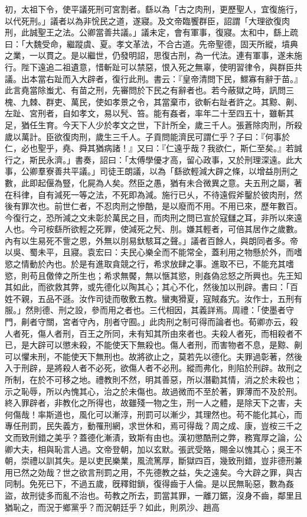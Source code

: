 \begin{pinyinscope}
初，太祖下令，使平議死刑可宮割者。繇以為「古之肉刑，更歷聖人，宜復施行，以代死刑。」議者以為非恱民之道，遂寢。及文帝臨饗群臣，詔謂「大理欲復肉刑，此誠聖王之法。公卿當善共議。」議未定，會有軍事，復寢。太和中，繇上疏曰：「大魏受命，繼蹤虞、夏。孝文革法，不合古道。先帝聖德，固天所縱，墳典之業，一以貫之。是以繼世，仍發明詔，思復古刑，為一代法。連有軍事，遂未施行。陛下遠追二祖遺意，惜斬趾可以禁惡，恨入死之無辜，使明習律令，與群臣共議。出本當右趾而入大辟者，復行此刑。書云：『皇帝清問下民，鰥寡有辭于苗。』此言堯當除蚩尤、有苗之刑，先審問於下民之有辭者也。若今蔽獄之時，訊問三槐、九棘、群吏、萬民，使如孝景之令，其當棄巿，欲斬右趾者許之。其黥、劓、左趾、宮刑者，自如孝文，易以髠、笞。能有姦者，率年二十至四五十，雖斬其足，猶任生育。今天下人少於孝文之世，下計所全，歲三千人。張蒼除肉刑，所殺歲以萬計。臣欲復肉刑，歲生三千人。子貢問能濟民可謂仁乎？子曰：『何事於仁，必也聖乎，堯、舜其猶病諸！』又曰：『仁遠乎哉？我欲仁，斯仁至矣。』若誠行之，斯民永濟。」書奏，詔曰：「太傅學優才高，留心政事，又於刑理深遠。此大事，公卿羣寮善共平議。」司徒王朗議，以為「繇欲輕減大辟之條，以增益刖刑之數，此即起偃為豎，化屍為人矣。然臣之愚，猶有未合微異之意。夫五刑之屬，著在科律，自有減死一等之法，不死即為減。施行已乆，不待遠假斧鑿於彼肉刑，然後有罪次也。前世仁者，不忍肉刑之慘酷，是以廢而不用。不用已來，歷年數百。今復行之，恐所減之文未彰於萬民之目，而肉刑之問已宣於寇讎之耳，非所以來遠人也。今可桉繇所欲輕之死罪，使減死之髠、刖。嫌其輕者，可倍其居作之歲數。內有以生易死不訾之恩，外無以刖易釱駭耳之聲。」議者百餘人，與朗同者多。帝以吳、蜀未平，且寢。袁宏曰：夫民心樂全而不能常全，蓋利用之物懸於外，而嗜慾之情動於內也。於是有進取貪競之行，希求放肆之事。進取不已，不能充其嗜慾，則苟且儌倖之所生也；希求無饜，無以愜其慾，則姦偽忿怒之所興也。先王知其如此，而欲救其弊，或先德化以陶其心；其心不化，然後加以刑辟。書曰：「百姓不親，五品不遜。汝作司徒而敬敷五教。蠻夷猾夏，寇賊姦宄。汝作士，五刑有服。」然則德、刑之設，參而用之者也。三代相因，其義詳焉。周禮：「使墨者守門，劓者守關，宮者守內，刖者守囿。」此肉刑之制可得而論者也。荀卿亦云，殺人者死，傷人者刑，百王之所同，未有知其所由來者也。夫殺人者死，而相殺者不已，是大辟可以懲未殺，不能使天下無殺也。傷人者刑，而害物者不息，是黥、劓可以懼未刑，不能使天下無刑也。故將欲止之，莫若先以德化。夫罪過彰著，然後入于刑辟，是將殺人者不必死，欲傷人者不必刑。縱而弗化，則陷於刑辟。故刑之所制，在於不可移之地。禮教則不然，明其善惡，所以潛勸其情，消之於未殺也；示之恥辱，所以內愧其心，治之於未傷也。故過微而不至於著，罪薄而不及於刑。終入罪辟者，非教化之所得也，故雖殘一物之生，刑一人之體，是除天下之害，夫何傷哉！率斯道也，風化可以漸淳，刑罰可以漸少，其理然也。苟不能化其心，而專任刑罰，民失義方，動罹刑網，求世休和，焉可得哉？周之成、康，豈桉三千之文而致刑錯之美乎？蓋德化漸漬，致斯有由也。漢初懲酷刑之弊，務寬厚之論，公卿大夫，相與恥言人過。文帝登朝，加以玄默。張武受賂，賜金以愧其心；吳王不朝，崇禮以訓其失。是以吏民樂業，風流篤厚，斷獄四百，幾致刑錯，豈非德刑兼用已然之効哉？世之欲言刑罰之用，不先德教之益，失之遠矣。今大辟之罪，與古同制。免死已下，不過五歲，旣釋鉗鎖，復得齒于人倫。是以民無恥惡，數為姦盜，故刑徒多而亂不治也。苟教之所去，罰當其罪，一離刀鋸，沒身不齒，鄰里且猶恥之，而況于鄉黨乎？而況朝廷乎？如此，則夙沙、趙高
\end{pinyinscope}
